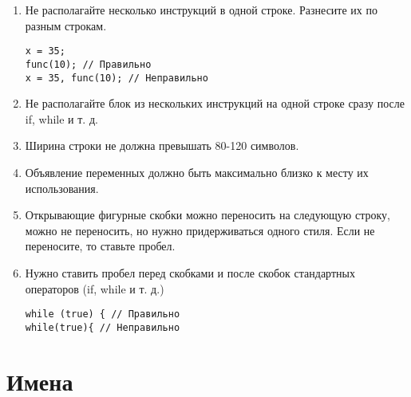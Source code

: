 \documentclass[10pt]{article}
\begin{document}
\begin{enumerate}
\item Не располагайте несколько инструкций в одной строке. Разнесите их по разным строкам.

\begin{lstlisting}
x = 35;
func(10); // Правильно
x = 35, func(10); // Неправильно
\end{lstlisting}

\item Не располагайте блок из нескольких инструкций на одной строке сразу после if, while и т. д.

\item Ширина строки не должна превышать 80-120 символов.

\item Объявление переменных должно быть максимально близко к месту их использования.

\item Открывающие фигурные скобки можно переносить на следующую строку, можно не переносить, но нужно придерживаться одного стиля. Если не переносите, то ставьте пробел.

\item Нужно ставить пробел перед скобками и после скобок стандартных операторов (if, while и т. д.)

\begin{lstlisting}
while (true) { // Правильно
while(true){ // Неправильно
\end{lstlisting}


\end{enumerate}

\section{Имена}
\end{document}
